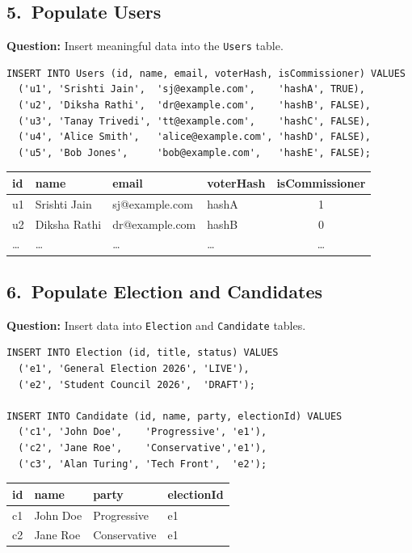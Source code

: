 \documentclass[12pt, a4paper]{article}
\begin{document}
\subsection{5.\ Populate Users}
\textbf{Question:} Insert meaningful data into the \texttt{Users} table.
\begin{lstlisting}
INSERT INTO Users (id, name, email, voterHash, isCommissioner) VALUES
  ('u1', 'Srishti Jain',  'sj@example.com',    'hashA', TRUE),
  ('u2', 'Diksha Rathi',  'dr@example.com',    'hashB', FALSE),
  ('u3', 'Tanay Trivedi', 'tt@example.com',    'hashC', FALSE),
  ('u4', 'Alice Smith',   'alice@example.com', 'hashD', FALSE),
  ('u5', 'Bob Jones',     'bob@example.com',   'hashE', FALSE);
\end{lstlisting}

\begin{center}
\begin{tabular}{|>{\ttfamily}l|l|l|>{\ttfamily}l|c|}
\hline
\textbf{id} & \textbf{name} & \textbf{email} & \textbf{voterHash} & \textbf{isCommissioner} \\
\hline
u1 & Srishti Jain & sj@example.com & hashA & 1 \\
u2 & Diksha Rathi & dr@example.com & hashB & 0 \\
\ldots & \ldots & \ldots & \ldots & \ldots \\
\hline
\end{tabular}
\end{center}

\subsection{6.\ Populate Election and Candidates}
\textbf{Question:} Insert data into \texttt{Election} and \texttt{Candidate} tables.
\begin{lstlisting}
INSERT INTO Election (id, title, status) VALUES
  ('e1', 'General Election 2026', 'LIVE'),
  ('e2', 'Student Council 2026',  'DRAFT');

INSERT INTO Candidate (id, name, party, electionId) VALUES
  ('c1', 'John Doe',    'Progressive', 'e1'),
  ('c2', 'Jane Roe',    'Conservative','e1'),
  ('c3', 'Alan Turing', 'Tech Front',  'e2');
\end{lstlisting}

\begin{center}
\begin{tabular}{|>{\ttfamily}l|l|l|>{\ttfamily}l|}
\hline
\textbf{id} & \textbf{name} & \textbf{party} & \textbf{electionId} \\
\hline
c1 & John Doe & Progressive  & e1 \\
c2 & Jane Roe & Conservative & e1 \\
\hline
\end{tabular}
\end{center}
\end{document}
